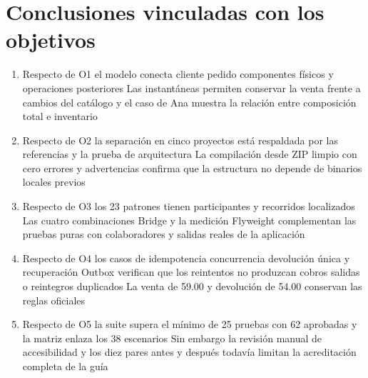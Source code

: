 
\section{Conclusiones vinculadas con los objetivos}
\begin{enumerate}[label=C\arabic*,leftmargin=1.2cm]
\item Respecto de O1 el modelo conecta cliente pedido componentes físicos y operaciones posteriores Las instantáneas permiten conservar la venta frente a cambios del catálogo y el caso de Ana muestra la relación entre composición total e inventario
\item Respecto de O2 la separación en cinco proyectos está respaldada por las referencias y la prueba de arquitectura La compilación desde ZIP limpio con cero errores y advertencias confirma que la estructura no depende de binarios locales previos
\item Respecto de O3 los 23 patrones tienen participantes y recorridos localizados Las cuatro combinaciones Bridge y la medición Flyweight complementan las pruebas puras con colaboradores y salidas reales de la aplicación
\item Respecto de O4 los casos de idempotencia concurrencia devolución única y recuperación Outbox verifican que los reintentos no produzcan cobros salidas o reintegros duplicados La venta de 59.00 y devolución de 54.00 conservan las reglas oficiales
\item Respecto de O5 la suite supera el mínimo de 25 pruebas con 62 aprobadas y la matriz enlaza los 38 escenarios Sin embargo la revisión manual de accesibilidad y los diez pares antes y después todavía limitan la acreditación completa de la guía
\end{enumerate}

